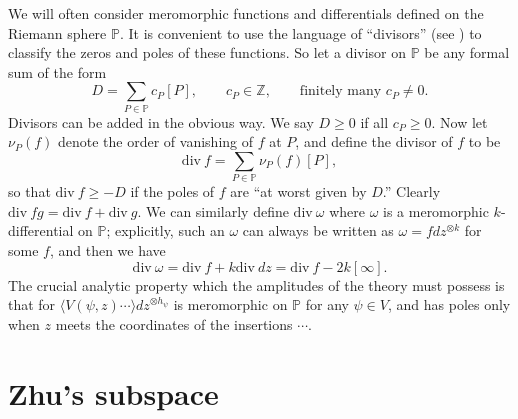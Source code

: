 \documentclass[a4paper,12pt]{article}
\newcommand{\Z}{{\mathbb Z}}
\newcommand{\PP}{{\mathbb P}}
\newcommand{\IP}[1]{\langle#1\rangle}
\newcommand{\Div}{\mathrm{div}\ }
\begin{document}
We will often consider meromorphic functions and differentials defined on the Riemann sphere $\PP$. 
It is convenient to use the language of ``divisors'' (see \cite{GH}) to classify the zeros
and poles of these functions.
So let a divisor on $\PP$ be any formal sum of the form
\begin{equation}
D = \sum_{P \in \PP} c_P [P], \qquad c_P \in \Z, \qquad \textrm{finitely many } c_P \ne 0.
\end{equation}
Divisors can be added in the obvious way.  We say $D \ge 0$ if all $c_P \ge 0$.  
Now let $\nu_P(f)$ denote the order of vanishing of $f$ at $P$, and define the divisor of $f$ to be
\begin{equation}
\Div f = \sum_{P \in \PP} \nu_P(f) [P],
\end{equation}
so that $\Div f \ge -D$ if the poles of $f$ are ``at worst given by $D$.''  Clearly $\Div fg = \Div f + \Div g$.
We can similarly define $\Div \omega$ where $\omega$ is a meromorphic $k$-differential on $\PP$; explicitly,
such an $\omega$ can always be written as $\omega = f dz^{\otimes k}$ for some $f$, and then
we have 
\begin{equation}
\Div \omega = \Div f + k \Div dz = \Div f - 2k [\infty].
\end{equation}
The crucial analytic property which the amplitudes of the theory must possess is that
for $\IP{V(\psi, z) \cdots} dz^{\otimes h_\psi}$ is meromorphic on $\PP$ for any $\psi \in V$, and has poles only when $z$ meets
the coordinates of the insertions $\cdots$.


\section{Zhu's subspace} \label{zhusec}
\end{document}
